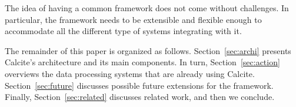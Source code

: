 The idea of having a common framework does not come without challenges. In particular, the framework needs to be extensible and flexible enough to accommodate all the different type of systems integrating with it.





 The remainder of this paper is organized
as follows. Section~\ref{sec:archi} presents Calcite's architecture and its main components. In turn, Section~\ref{sec:action} overviews the data processing systems that are already using Calcite. Section~\ref{sec:future} discusses possible future extensions for the framework. Finally, Section~\ref{sec:related} discusses related work, and then we conclude.

